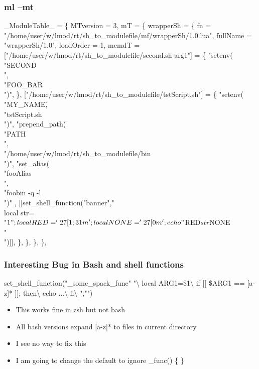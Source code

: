 \documentclass{beamer}
\begin{document}
\begin{frame}[fragile]
  \frametitle{ml --mt}
    {\tiny
\begin{semiverbatim}
\_ModuleTable\_ = \{
  MTversion = 3,
  mT = \{
    wrapperSh = \{
      fn = "/home/user/w/lmod/rt/sh_to_modulefile/mf/wrapperSh/1.0.lua",
      fullName = "wrapperSh/1.0",
      loadOrder = 1,
      mcmdT = {
        ["/home/user/w/lmod/rt/sh_to_modulefile/second.sh arg1"] = \{
          "setenv(\\"SECOND\\",\\"FOO_BAR\\")",
        \},
        ["/home/user/w/lmod/rt/sh_to_modulefile/tstScript.sh"] = \{
          "setenv(\\"MY_NAME\",\\"tstScript.sh\\")",
          "prepend_path(\\"PATH\\",\\"/home/user/w/lmod/rt/sh_to_modulefile/bin\\")",
          "set_alias(\\"fooAlias\\",\\"foobin -q -l\\")"
          , [[set_shell_function("banner"," \\
    local str=\\"$1\\";\\
    local RED='\\27[1;31m';\\
    local NONE='\\27[0m';\\
    echo \\"${RED}${str}${NONE}\\"\\
")]], 
        \},
      \},
    \},
  \},
}
\end{semiverbatim}
    }
\end{frame}

\begin{frame}[fragile]
  \frametitle{Interesting Bug in Bash and shell functions}
    {\tiny
\begin{semiverbatim}
    set_shell_function("_some_spack_func" "\textbackslash
       local ARG1=\$1\textbackslash
       if [[ \$ARG1 == {\color{red}[a-z]*} ]]; then\textbackslash
         echo ...\textbackslash
       fi\textbackslash
    ","")
\end{semiverbatim}
    }
  \begin{itemize}
    \item This works fine in zsh but not bash
    \item All bash versions expand [a-z]\** to files in current directory
    \item I see no way to fix this
    \item I am going to change the default to ignore {\color{blue}\_func() \{ \}}
  \end{itemize}
\end{frame}
\end{document}
